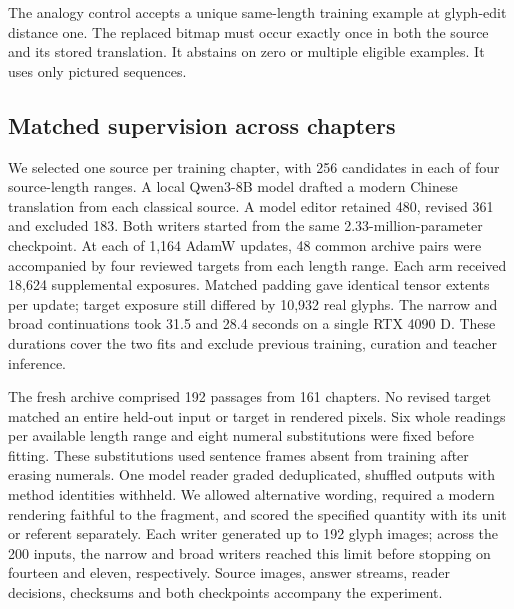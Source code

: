 \documentclass[12pt,a4paper]{article}
\providecommand{\DIFadd}[1]{{\protect\color{blue} \sf #1}} %
\begin{document}
\DIFadd{The analogy control accepts a unique same-length training example at glyph-edit distance one. The replaced bitmap must occur exactly once in both the source and its stored translation. It abstains on zero or multiple eligible examples. It uses only pictured sequences.
}

\subsection*{\DIFadd{Matched supervision across chapters}}
\DIFadd{We selected one source per training chapter, with 256 candidates in each of four source-length ranges. A local Qwen3-8B model drafted a modern Chinese translation from each classical source. A model editor retained 480, revised 361 and excluded 183. Both writers started from the same 2.33-million-parameter checkpoint. At each of 1,164 AdamW updates, 48 common archive pairs were accompanied by four reviewed targets from each length range. Each arm received 18,624 supplemental exposures. Matched padding gave identical tensor extents per update; target exposure still differed by 10,932 real glyphs. The narrow and broad continuations took 31.5 and 28.4 seconds on a single RTX 4090 D. These durations cover the two fits and exclude previous training, curation and teacher inference.
}

\DIFadd{The fresh archive comprised 192 passages from 161 chapters. No revised target matched an entire held-out input or target in rendered pixels. Six whole readings per available length range and eight numeral substitutions were fixed before fitting. These substitutions used sentence frames absent from training after erasing numerals. One model reader graded deduplicated, shuffled outputs with method identities withheld. We allowed alternative wording, required a modern rendering faithful to the fragment, and scored the specified quantity with its unit or referent separately. Each writer generated up to 192 glyph images; across the 200 inputs, the narrow and broad writers reached this limit before stopping on fourteen and eleven, respectively. Source images, answer streams, reader decisions, checksums and both checkpoints accompany the experiment.
}
\end{document}
